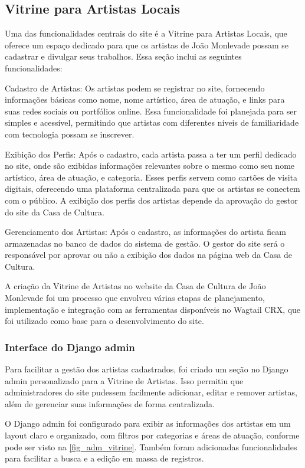 \subsection{Vitrine para Artistas Locais}

Uma das funcionalidades centrais do site é a Vitrine para Artistas Locais, que oferece um espaço dedicado para que os artistas de João Monlevade possam se cadastrar e divulgar seus trabalhos. Essa seção inclui as seguintes funcionalidades:

Cadastro de Artistas: Os artistas podem se registrar no site, fornecendo informações básicas como nome, nome artístico, área de atuação, e links para suas redes sociais ou portfólios online. Essa funcionalidade foi planejada para ser simples e acessível, permitindo que artistas com diferentes níveis de familiaridade com tecnologia possam se inscrever.

Exibição dos Perfis: Após o cadastro, cada artista passa a ter um perfil dedicado no site, onde são exibidas informações relevantes sobre o mesmo como seu nome artístico, área de atuação, e categoria. Esses perfis servem como cartões de visita digitais, oferecendo uma plataforma centralizada para que os artistas se conectem com o público. A exibição dos perfis dos artistas depende da aprovação do gestor do site da Casa de Cultura.

Gerenciamento dos Artistas: Após o cadastro, as informações do artista ficam armazenadas no banco de dados do sistema de gestão. O gestor do site será o responsável por aprovar ou não a exibição dos dados na página web da Casa de Cultura.

A criação da Vitrine de Artistas no website da Casa de Cultura de João Monlevade foi um processo que envolveu várias etapas de planejamento, implementação e integração com as ferramentas disponíveis no Wagtail CRX, que foi utilizado como base para o desenvolvimento do site.


\subsubsection{Interface do Django admin}

Para facilitar a gestão dos artistas cadastrados, foi criado um seção no Django admin personalizado para a Vitrine de Artistas. Isso permitiu que administradores do site pudessem facilmente adicionar, editar e remover artistas, além de gerenciar suas informações de forma centralizada.

O Django admin foi configurado para exibir as informações dos artistas em um layout claro e organizado, com filtros por categorias e áreas de atuação, conforme pode ser visto na \autoref{fig_adm_vitrine}. Também foram adicionadas funcionalidades para facilitar a busca e a edição em massa de registros.


